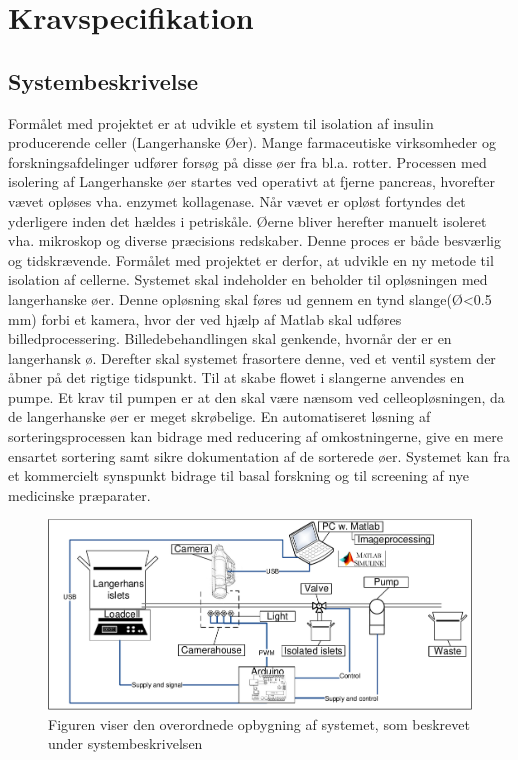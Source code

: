 \chapter{Kravspecifikation} \label{ch:ks}




\newpage
\section{Systembeskrivelse}
Formålet med projektet er at udvikle et system til isolation af insulin producerende celler (Langerhanske Øer). Mange farmaceutiske virksomheder og forskningsafdelinger udfører forsøg på disse øer fra bl.a. rotter. Processen med isolering af Langerhanske øer startes ved operativt at fjerne pancreas, hvorefter vævet opløses vha. enzymet kollagenase. Når vævet er opløst fortyndes det yderligere inden det hældes i petriskåle. Øerne bliver herefter manuelt isoleret vha. mikroskop og diverse præcisions redskaber. Denne proces er både besværlig og tidskrævende. Formålet med projektet er derfor, at udvikle en ny metode til isolation af cellerne. Systemet skal indeholder en beholder til opløsningen med langerhanske øer. Denne opløsning skal føres ud gennem en tynd slange(Ø<0.5 mm)  forbi et kamera, hvor der ved hjælp af Matlab skal udføres billedprocessering. Billedebehandlingen skal genkende, hvornår der er en langerhansk ø. Derefter skal systemet frasortere denne, ved et ventil system der åbner på det rigtige tidspunkt. Til at skabe flowet i slangerne anvendes en pumpe.  Et krav til pumpen er at den skal være nænsom ved celleopløsningen, da de langerhanske øer er meget skrøbelige.
En automatiseret løsning af sorteringsprocessen kan bidrage med reducering af omkostningerne, give en mere ensartet sortering samt sikre dokumentation af de sorterede øer. Systemet kan fra et kommercielt synspunkt bidrage til basal forskning og til screening af nye medicinske præparater.

\begin{figure}[H]
	\centering
	\includegraphics[width=1\textwidth]{billeder/DMTS.pdf}
	\caption{Figuren viser den overordnede opbygning af systemet, som beskrevet under systembeskrivelsen}
	\label{fig:usecase}
\end{figure}

